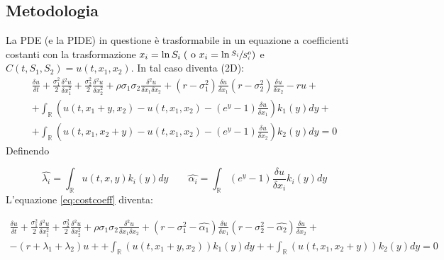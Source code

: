 \documentclass[a4paper,10pt]{article}
\newcommand{\der}[2]{\frac{\delta #1}{\delta #2}}
\newcommand{\dder}[2]{\frac{\delta^2 #1}{\delta #2^2}}
\newcommand{\dmix}[3]{\frac{\delta^2 #1}{\delta #2 \delta #3}}
\begin{document}
\subsection{Metodologia}
\label{sec:metod}
La PDE (e la PIDE) in questione è trasformabile in un equazione a coefficienti costanti con la trasformazione $x_i=\ln{S_i} \; (\text{ o } x_i=\ln{\sfrac{S_i}{S_i^0}})$ e $C(t,S_1,S_2)=u(t,x_1,x_2)$. In tal caso diventa (2D):
{
\begin{multline}
 \der{u}{t}+\frac{\sigma_1^2}{2}\dder{u}{x_1}+\frac{\sigma_2^2}{2}\dder{u}{x_2}+\rho\sigma_1\sigma_2\dmix{u}{x_1}{x_2}+
 \left(r-\sigma_1^2\right)\der{u}{x_1}
 \left(r-\sigma_2^2\right)\der{u}{x_2}-ru+\\
 +\int_\mathbb{R}\left( u(t,x_1+y,x_2)-u(t,x_1,x_2)-(e^y-1)\der{u}{x_1}\right)k_1(y)dy+\\
 +\int_\mathbb{R}\left( u(t,x_1,x_2+y)-u(t,x_1,x_2)-(e^y-1)\der{u}{x_2}\right)k_2(y)dy=0
 \label{eq:costcoeff}
 \end{multline}
}
Definendo 

\begin{equation*}
 \hat{\lambda_i}=\int_\mathbb{R}u(t,x,y)k_i(y)dy \qquad \hat{\alpha_i}=\int_\mathbb{R}(e^y-1)\der{u}{x_i}k_i(y)dy
\end{equation*}
L'equazione \eqref{eq:costcoeff} diventa: 

{
\small
\begin{multline}
 \der{u}{t}+\frac{\sigma_1^2}{2}\dder{u}{x_1}+\frac{\sigma_2^2}{2}\dder{u}{x_2}+\rho\sigma_1\sigma_2\dmix{u}{x_1}{x_2}+
 \left(r-\sigma_1^2-\hat{\alpha_1}\right)\der{u}{x_1}
 \left(r-\sigma_2^2-\hat{\alpha_2}\right)\der{u}{x_2}+\\-(r+\lambda_1+\lambda_2)u+
 +\int_\mathbb{R}\left( u(t,x_1+y,x_2)\right)k_1(y)dy+
 +\int_\mathbb{R}\left( u(t,x_1,x_2+y)\right)k_2(y)dy=0
 \label{eq:costcoeff2}
\end{multline}
}

\end{document}
